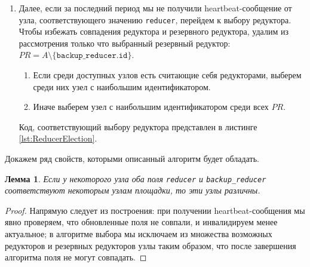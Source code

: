 \documentclass{article}
\theoremstyle{plain}
\theoremstyle{plain}
\theoremstyle{plain}
\newtheorem{lemma}{Лемма}[section]
\theoremstyle{plain}
\theoremstyle{definition}
\theoremstyle{remark}
\theoremstyle{plain}
\begin{document}
\begin{enumerate}
    \item Далее, если за последний период мы не получили heartbeat-со\-об\-ще\-ние от узла, соответствующего значению \texttt{reducer},  перейдем к выбору редуктора. Чтобы избежать совпадения редуктора и резервного редуктора, удалим из рассмотрения только что выбранный резервный редуктор: $PR = A \setminus \{ \texttt{backup\_reducer.id} \}$.

    \begin{enumerate}
        \item Если среди доступных узлов есть считающие себя редукторами, выберем среди них узел с наибольшим идентификатором.

        \item Иначе выберем узел с наибольшим идентификатором среди всех $PR$.
    \end{enumerate}
    
    Код, соответствующий выбору редуктора представлен в листинге \ref{lst:ReducerElection}.
    

\end{enumerate}

Докажем ряд свойств, которыми описанный алгоритм будет обладать.

\begin{lemma}
\label{ElectionSafety}
    Если у некоторого узла оба поля \texttt{reducer} и \texttt{backup\_reducer} соответствуют некоторым узлам площадки, то эти узлы различны.
\end{lemma}
\begin{proof}
    Напрямую следует из построения: при получении heartbeat-со\-об\-ще\-ния мы явно проверяем, что обновленные поля не совпали, и инвалидируем менее актуальное; в алгоритме выбора мы исключаем из множества возможных редукторов и резервных редукторов узлы таким образом, что после завершения алгоритма поля не могут совпадать.
\end{proof}
\end{document}

